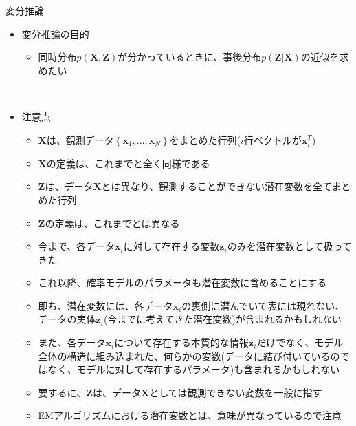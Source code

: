 \documentclass[dvipdfmx,notheorems,t]{beamer}
\begin{document}
\begin{frame}{変分推論}

\begin{itemize}
	\item 変分推論の目的
	\begin{itemize}
		\item 同時分布$p(\bm{X}, \bm{Z})$が分かっているときに、\alert{事後分布}$p(\bm{Z} | \bm{X})$の近似を求めたい
	\end{itemize} \
	
	\item 注意点
	\begin{itemize}
		\item $\bm{X}$は、観測データ$\left\{ \bm{x}_1, \ldots, \bm{x}_N \right\}$をまとめた行列($i$行ベクトルが$\bm{x}_i^T$)
		\item $\bm{X}$の定義は、これまでと全く同様である
		\newline
		
		\item $\bm{Z}$は、データ$\bm{X}$とは異なり、\alert{観測することができない潜在変数}を全てまとめた行列
		\item $\bm{Z}$の定義は、\alert{これまでとは異なる}
		\newline
		
		\item 今まで、各データ$\bm{x}_i$に対して存在する変数$\bm{z}_i$のみを潜在変数として扱ってきた
		\item これ以降、\alert{確率モデルのパラメータも潜在変数に含める}ことにする
		\newline
		
		\item 即ち、潜在変数には、各データ$\bm{x}_i$の裏側に潜んでいて表には現れない、データの実体$\bm{z}_i$(今までに考えてきた潜在変数)が含まれるかもしれない
		\newline
		\item また、各データ$\bm{x}_i$について存在する本質的な情報$\bm{z}_i$だけでなく、モデル全体の構造に組み込まれた、何らかの変数(データに結び付いているのではなく、モデルに対して存在するパラメータ)も含まれるかもしれない
		\newline
		
		\item 要するに、$\bm{Z}$は、\color{red}データ$\bm{X}$としては観測できない変数を一般に指す\normalcolor
		\item EMアルゴリズムにおける潜在変数とは、\alert{意味が異なっている}ので注意
	\end{itemize} \
	

\end{itemize}
\end{frame}
\end{document}
